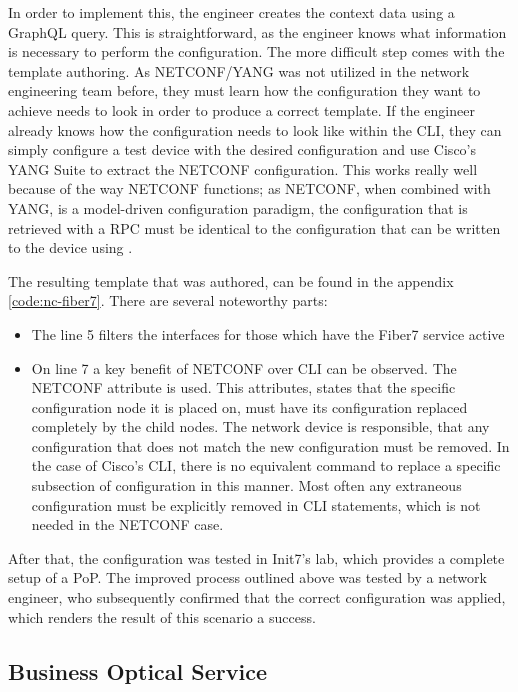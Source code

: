 In order to implement this, the engineer creates the context data using a GraphQL query.
This is straightforward, as the engineer knows what information is necessary to perform
the configuration.
The more difficult step comes with the template authoring. As NETCONF/YANG was not
utilized in the network engineering team before, they must learn
how the configuration they want to achieve needs to look in order
to produce a correct template.
If the engineer already knows how the configuration needs to look
like within the CLI, they can simply configure a test device with
the desired configuration and use Cisco's YANG Suite to extract
the NETCONF configuration. This works really well because of the way NETCONF functions; as
NETCONF, when combined with YANG, is a model-driven configuration paradigm,
the configuration that is retrieved with a  RPC
must be identical to the configuration that can be written
to the device using .

The resulting template that was authored, can be found in the appendix \ref{code:nc-fiber7}.
There are several noteworthy parts:

\begin{itemize}
  \item The line 5 filters the interfaces for those which have the Fiber7 service active
  \item On line 7 a key benefit of NETCONF over CLI can be observed. The NETCONF attribute
         is used. This attributes, states that the specific configuration
        node it is placed on, must have its configuration replaced completely by the child nodes.
        The network device is responsible, that any configuration that does not match the
        new configuration must be removed. In the case of Cisco's CLI, there is no equivalent
        command to replace a specific subsection of configuration in this manner. Most often
        any extraneous configuration must be explicitly removed in CLI statements, which is
        not needed in the NETCONF case.
\end{itemize}

After that, the configuration was tested in Init7's lab, which provides a complete setup of a PoP.
The improved process outlined above was tested by a network engineer, who subsequently confirmed
that the correct configuration was applied, which renders the result of this scenario a success.

\subsection{Business Optical Service}

